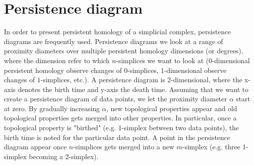 \section{Persistence diagram}
In order to present persistent homology of a simplicial complex, persistence diagrams are frequently used. Persistence diagrams we look at a range of proximity diameters over multiple persistent homology dimensions (or degrees), where the dimension refer to which $n$-simplices we want to look at (0-dimensional persistent homology observe changes of $0$-simplices, 1-dimensional observe changes of $1$-simplices, etc.). A persistence diagram is 2-dimensional, where the x-axis denotes the birth time and y-axis the death time. Assuming that we want to create a persistence diagram of data points, we let the proximity diameter $\alpha$ start at zero. By gradually increasing $\alpha$, new topological properties appear and old topological properties gets merged into other properties. In particular, once a topological property is "birthed" (e.g. 1-simplex between two data points), the birth time is noted for the particular data point. A point in the persistence diagram appear once $n$-simplices gets merged into a new $m$-simplex (e.g. three 1-simplex becoming a 2-simplex).

